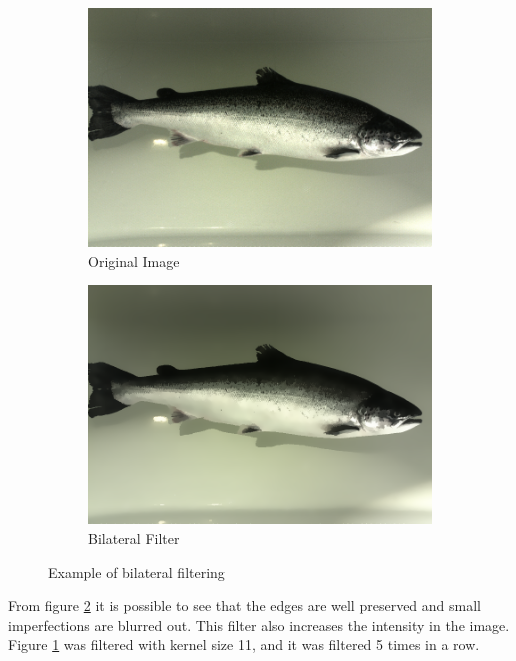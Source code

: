 \begin{figure}[h]
    \centering
    \begin{subfigure}{0.5\textwidth}
        \centering
        \includegraphics[width=.98\linewidth]{images/literature/original_fish}
        \caption{Original Image}
    \end{subfigure}%
    \begin{subfigure}{.5\textwidth}
        \centering
        \includegraphics[width=.98\linewidth]{images/literature/bilateralblur}
        \caption{Bilateral Filter}
        \label{fig:bilateral_filter_b}
    \end{subfigure}
    \caption{Example of bilateral filtering}
    \label{fig:bilateral_filter}
\end{figure}

From figure \ref{fig:bilateral_filter} it is possible to see that the edges are well preserved and small imperfections are blurred out. This filter also increases the intensity in the image. Figure \ref{fig:bilateral_filter_b} was filtered with kernel size 11, and it was filtered 5 times in a row.


